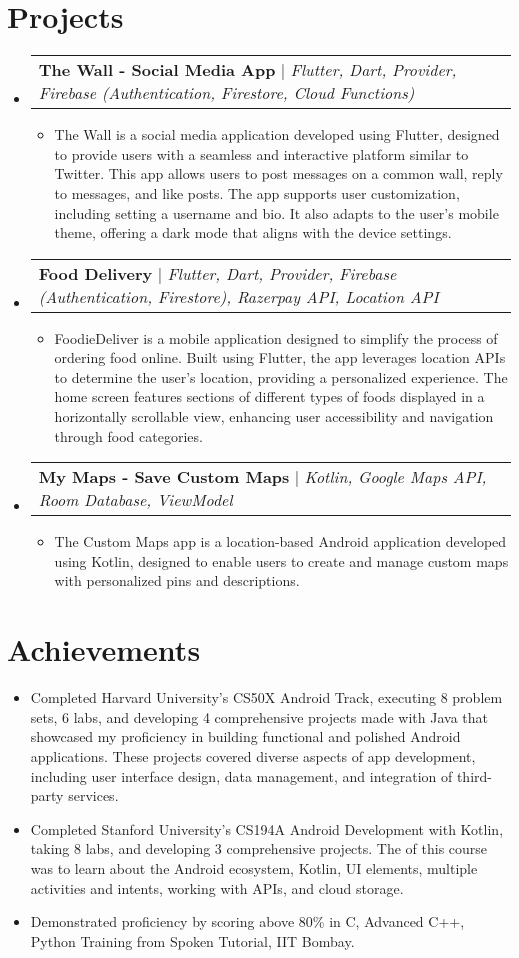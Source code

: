 \documentclass[letterpaper,11pt]{article}
\makeatletter
\newcommand{\resumeItem}[1]{
  \item\small{
    {#1 \vspace{-2pt}}
  }
}
\newcommand{\resumeProjectHeading}[2]{
    \item
    \begin{tabular*}{0.97\textwidth}{l@{\extracolsep{\fill}}r}
      \small#1 & #2 \\
    \end{tabular*}\vspace{-7pt}
}
\newcommand{\resumeSubHeadingListStart}{\begin{itemize}[leftmargin=0.15in, label={}]}
\newcommand{\resumeSubHeadingListEnd}{\end{itemize}}
\newcommand{\resumeItemListStart}{\begin{itemize}}
\newcommand{\resumeItemListEnd}{\end{itemize}\vspace{-5pt}}
\makeatother
\begin{document}
\section{Projects}
    \resumeSubHeadingListStart
      \resumeProjectHeading
          {\textbf{The Wall - Social Media App} $|$ \emph{Flutter, Dart, Provider, Firebase (Authentication, Firestore, Cloud Functions)}}{}
          \resumeItemListStart
            \resumeItem{The Wall is a social media application developed using Flutter, designed to provide users with a seamless and interactive platform similar to Twitter. This app allows users to post messages on a common wall, reply to messages, and like posts. The app supports user customization, including setting a username and bio. It also adapts to the user's mobile theme, offering a dark mode that aligns with the device settings.}
          \resumeItemListEnd
      \resumeProjectHeading
          {\textbf{Food Delivery} $|$ \emph{Flutter, Dart, Provider, Firebase (Authentication, Firestore), Razerpay API, Location API}}{}
          \resumeItemListStart
            \resumeItem{FoodieDeliver is a mobile application designed to simplify the process of ordering food online. Built using Flutter, the app leverages location APIs to determine the user's location, providing a personalized experience. The home screen features sections of different types of foods displayed in a horizontally scrollable view, enhancing user accessibility and navigation through food categories.}
          \resumeItemListEnd
     \resumeProjectHeading
          {\textbf{My Maps - Save Custom Maps} $|$ \emph{Kotlin, Google Maps API, Room Database, ViewModel}}{}
          \resumeItemListStart
            \resumeItem{The Custom Maps app is a location-based Android application developed using Kotlin, designed to enable users to create and manage custom maps with personalized pins and descriptions.}
          \resumeItemListEnd
    \resumeSubHeadingListEnd
%

\section{Achievements}
\resumeItemListStart
            \resumeItem{Completed Harvard University's CS50X Android Track, executing 8 problem sets, 6 labs, and developing 4 comprehensive projects made with Java that showcased my proficiency in building functional and polished Android applications. These projects covered diverse aspects of app development, including user interface design, data management, and integration of third-party services.}
            \resumeItem{Completed Stanford University's CS194A Android Development with Kotlin, taking 8 labs, and developing 3 comprehensive projects. The of this course was to learn about the Android ecosystem, Kotlin, UI elements, multiple activities and intents, working with APIs, and cloud storage.}
            \resumeItem{Demonstrated proficiency by scoring above 80\% in C, Advanced C++, Python Training from Spoken Tutorial, IIT Bombay.}
        \resumeItemListEnd
%


\end{document}
